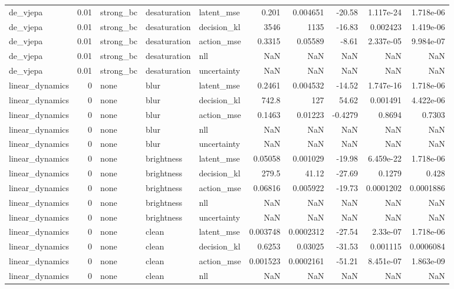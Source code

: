 \begin{tabular}{lrlllrrrrr}
de\_vjepa & 0.01 & strong\_bc & desaturation & latent\_mse & 0.201 & 0.004651 & -20.58 & 1.117e-24 & 1.718e-06 \\
de\_vjepa & 0.01 & strong\_bc & desaturation & decision\_kl & 3546 & 1135 & -16.83 & 0.002423 & 1.419e-06 \\
de\_vjepa & 0.01 & strong\_bc & desaturation & action\_mse & 0.3315 & 0.05589 & -8.61 & 2.337e-05 & 9.984e-07 \\
de\_vjepa & 0.01 & strong\_bc & desaturation & nll & NaN & NaN & NaN & NaN & NaN \\
de\_vjepa & 0.01 & strong\_bc & desaturation & uncertainty & NaN & NaN & NaN & NaN & NaN \\
linear\_dynamics & 0 & none & blur & latent\_mse & 0.2461 & 0.004532 & -14.52 & 1.747e-16 & 1.718e-06 \\
linear\_dynamics & 0 & none & blur & decision\_kl & 742.8 & 127 & 54.62 & 0.001491 & 4.422e-06 \\
linear\_dynamics & 0 & none & blur & action\_mse & 0.1463 & 0.01223 & -0.4279 & 0.8694 & 0.7303 \\
linear\_dynamics & 0 & none & blur & nll & NaN & NaN & NaN & NaN & NaN \\
linear\_dynamics & 0 & none & blur & uncertainty & NaN & NaN & NaN & NaN & NaN \\
linear\_dynamics & 0 & none & brightness & latent\_mse & 0.05058 & 0.001029 & -19.98 & 6.459e-22 & 1.718e-06 \\
linear\_dynamics & 0 & none & brightness & decision\_kl & 279.5 & 41.12 & -27.69 & 0.1279 & 0.428 \\
linear\_dynamics & 0 & none & brightness & action\_mse & 0.06816 & 0.005922 & -19.73 & 0.0001202 & 0.0001886 \\
linear\_dynamics & 0 & none & brightness & nll & NaN & NaN & NaN & NaN & NaN \\
linear\_dynamics & 0 & none & brightness & uncertainty & NaN & NaN & NaN & NaN & NaN \\
linear\_dynamics & 0 & none & clean & latent\_mse & 0.003748 & 0.0002312 & -27.54 & 2.33e-07 & 1.718e-06 \\
linear\_dynamics & 0 & none & clean & decision\_kl & 0.6253 & 0.03025 & -31.53 & 0.001115 & 0.0006084 \\
linear\_dynamics & 0 & none & clean & action\_mse & 0.001523 & 0.0002161 & -51.21 & 8.451e-07 & 1.863e-09 \\
linear\_dynamics & 0 & none & clean & nll & NaN & NaN & NaN & NaN & NaN \\

\end{tabular}
